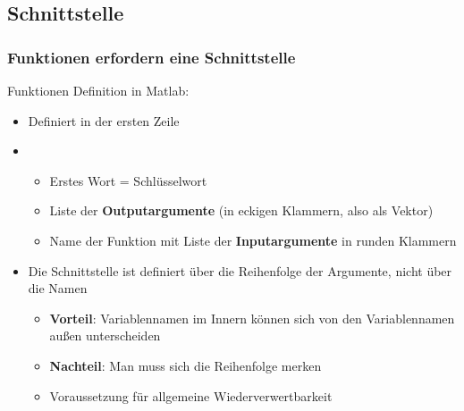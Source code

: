   \subsection{Schnittstelle}
  \begin{frame}
      \frametitle{Funktionen erfordern eine Schnittstelle}
      Funktionen Definition in Matlab:
      \begin{itemize}
        \item Definiert in der ersten Zeile
        \item {}
        \begin{itemize}
          \item Erstes Wort = Schlüsselwort 
          \item Liste der \textbf{Outputargumente} (in eckigen Klammern, also als Vektor)
          \item Name der Funktion mit Liste der \textbf{Inputargumente} in runden Klammern
        \end{itemize}
        \item Die Schnittstelle ist definiert über die Reihenfolge der Argumente, nicht über die Namen
        \begin{itemize}
          \item \textbf{Vorteil}: Variablennamen im Innern können sich von den Variablennamen außen unterscheiden
          \item \textbf{Nachteil}: Man muss sich die Reihenfolge merken
          \item Voraussetzung für allgemeine Wiederverwertbarkeit
        \end{itemize}
      \end{itemize}
  \end{frame}


